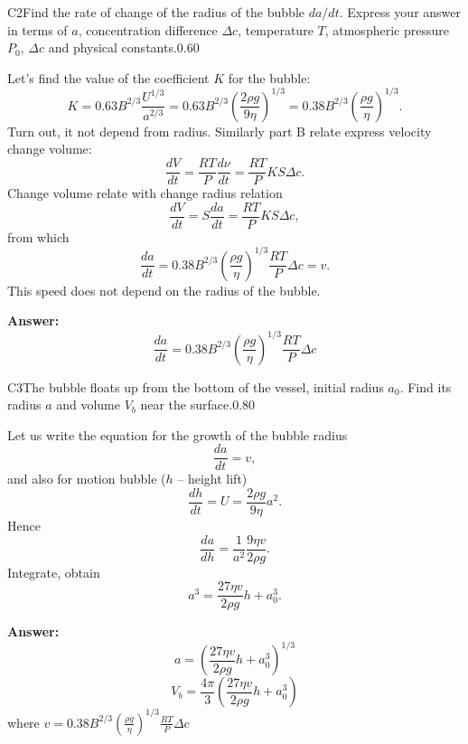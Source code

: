 \documentclass[11pt,a4paper]{article}
\begin{document}
\begin{solcard}{C2}{Find the rate of change of the radius of the bubble $da/dt$. Express your answer in terms of $a$, concentration difference $\Delta c$, temperature $T$, atmospheric pressure $P_0$, $\Delta c$ and physical constants.}{0.60}

Let's find the value of the coefficient $K$ for the bubble: $$ K = 0.63 B^{2/3} \frac{U^{1/3}}{a^{2/3}} = 0.63 B^{2/3} \left(\frac{2 \rho g}{9 \eta}\right)^{1/3} =  0.38 B^{2/3} \left(\frac{ \rho g}{ \eta}\right)^{1/3}. $$ Turn out, it not depend from radius. Similarly part B relate express velocity change volume: $$ \frac{dV}{dt} = \frac{RT}{P} \frac{d\nu}{dt} =  \frac{RT}{P} KS \Delta c. $$ Change volume relate with change radius relation $$ \frac{dV}{dt} =  S \frac{da}{dt}  = \frac{RT}{P} KS \Delta c, $$ from which $$ \frac{da}{dt} =  0.38 B^{2/3} \left(\frac{ \rho g}{ \eta}\right)^{1/3} \frac{RT}{P} \Delta c = v. $$ This speed does not depend on the radius of the bubble.

\par\smallskip\noindent\textbf{Answer:} $$ \frac{da}{dt} =  0.38 B^{2/3} \left(\frac{ \rho g}{ \eta}\right)^{1/3} \frac{RT}{P} \Delta c $$
\end{solcard}

\begin{solcard}{C3}{The bubble floats up from the bottom of the vessel, initial radius $a_0$. Find its radius $a$ and volume $V_b$ near the surface.}{0.80}

Let us write the equation for the growth of the bubble radius $$ \frac{da}{dt} = v, $$ and also for motion bubble ($h$ – height lift) $$ \frac{d h}{dt} = U = \frac{2 \rho g}{9 \eta}a^2. $$ Hence $$ \frac{da}{dh} = \frac{1}{a^2} \frac{9 \eta v}{2 \rho g}. $$ Integrate, obtain $$ a^3 = \frac{27 \eta v}{2 \rho g} h + a^3_0. $$

\par\smallskip\noindent\textbf{Answer:} $$ a = \left(\frac{27 \eta v}{2 \rho g} h + a^3_0\right)^{1/3} $$ $$ V_b = \frac{4 \pi}{3} \left(\frac{27 \eta v}{2 \rho g} h + a^3_0\right) $$ where $v =0.38 B^{2/3} \left(\frac{ \rho g}{ \eta}\right)^{1/3} \frac{RT}{P} \Delta c$
\end{solcard}
\end{document}

